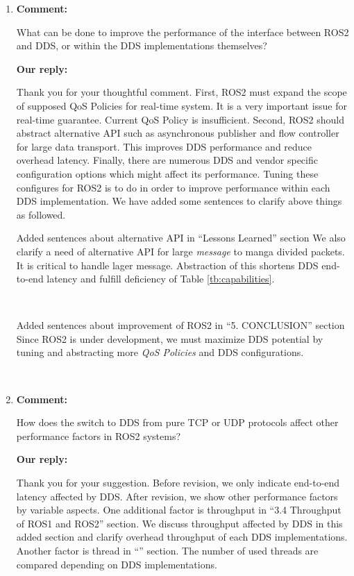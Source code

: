 \documentclass{article}
\begin{document}
\begin{enumerate}
\item \begin{flushleft}
    \textbf{Comment:}
  \end{flushleft}
  What can be done to improve the performance of the interface between ROS2 and DDS, or within the DDS implementations themselves?

  \begin{flushleft}
    \textbf{Our reply:}
  \end{flushleft}
  Thank you for your thoughtful comment.
  First, ROS2 must expand the scope of supposed QoS Policies for real-time system.
  It is a very important issue for real-time guarantee.
  Current QoS Policy is insufficient.
  Second, ROS2 should abstract alternative API such as asynchronous publisher and flow controller for large data transport.
  This improves DDS performance and reduce overhead latency.
  Finally, there are numerous DDS and vendor specific configuration options which might affect its performance.
  Tuning these configures for ROS2 is to do in order to improve performance within each DDS implementation.
  We have added some sentences to clarify above things as followed.
  \begin{itembox}[|]{Added sentences about alternative API in ``Lessons Learned'' section}
    We also clarify a need of alternative API for large \emph{message} to manga divided packets.
    It is critical to handle lager message.
    Abstraction of this shortens DDS end-to-end latency and fulfill deficiency of Table \ref{tb:capabilities}.
  \end{itembox}\\
  \begin{itembox}[|]{Added sentences about improvement of ROS2 in ``5. CONCLUSION'' section}
    Since ROS2 is under development, we must maximize DDS potential by tuning and abstracting more \emph{QoS Policies} and DDS configurations.
  \end{itembox}\\

\item \begin{flushleft}
    \textbf{Comment:}
  \end{flushleft}
  How does the switch to DDS from pure TCP or UDP protocols affect other performance factors in ROS2 systems? 

  \begin{flushleft}
    \textbf{Our reply:}
  \end{flushleft}
  Thank you for your suggestion.
  Before revision, we only indicate end-to-end latency affected by DDS.
  After revision, we show other performance factors by variable aspects.
  One additional factor is throughput in ``3.4 Throughput of ROS1 and ROS2'' section.
  We discuss throughput affected by DDS in this added section and clarify overhead throughput of each DDS implementations.
  Another factor is thread in ``'' section.
  The number of used threads are compared depending on DDS implementations.

\end{enumerate}
\end{document}
